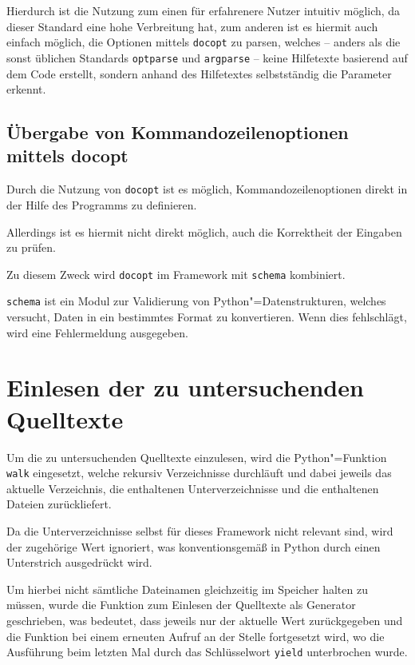             Hierdurch ist die Nutzung zum einen für erfahrenere Nutzer intuitiv möglich,
            da dieser Standard eine hohe Verbreitung hat,
            zum anderen ist es hiermit auch einfach möglich,
            die Optionen mittels
            \lstinline{docopt} zu parsen,
            welches
            -- anders als die sonst üblichen Standards
            \lstinline{optparse} und
            \lstinline{argparse}
            -- keine Hilfetexte basierend auf dem Code erstellt,
            sondern anhand des Hilfetextes selbstständig die Parameter erkennt.\cite{Keleshev2018}

        \subsection{Übergabe von Kommandozeilenoptionen mittels docopt}
            Durch die Nutzung von
            \lstinline{docopt} ist es möglich,
            Kommandozeilenoptionen direkt in der Hilfe des Programms zu definieren.

            Allerdings ist es hiermit nicht direkt möglich,
            auch die Korrektheit der Eingaben zu prüfen.

            Zu diesem Zweck wird
            \lstinline{docopt} im Framework mit
            \lstinline{schema} kombiniert.

            \lstinline{schema} ist ein Modul zur Validierung von Python"=Datenstrukturen,
            welches versucht,
            Daten in ein bestimmtes Format zu konvertieren.
            Wenn dies fehlschlägt,
            wird eine Fehlermeldung ausgegeben.\cite{Keleshev2018a}

    \section{Einlesen der zu untersuchenden Quelltexte}\label{Einlesen der zu untersuchenden Quelltexte}
        Um die zu untersuchenden Quelltexte einzulesen,
        wird die Python"=Funktion
        \lstinline{walk} eingesetzt,
        welche rekursiv Verzeichnisse durchläuft und
        dabei jeweils das aktuelle Verzeichnis,
        die enthaltenen Unterverzeichnisse und
        die enthaltenen Dateien zurückliefert.

        Da die Unterverzeichnisse selbst für dieses Framework nicht relevant sind,
        wird der zugehörige Wert ignoriert,
        was konventionsgemäß in Python durch einen Unterstrich ausgedrückt wird.

        Um hierbei nicht sämtliche Dateinamen gleichzeitig im Speicher halten zu müssen,
        wurde die Funktion zum Einlesen der Quelltexte als Generator geschrieben,
        was bedeutet,
        dass jeweils nur der aktuelle Wert zurückgegeben und
        die Funktion bei einem erneuten Aufruf an der Stelle fortgesetzt wird,
        wo die Ausführung beim letzten Mal durch das Schlüsselwort
        \lstinline{yield} unterbrochen wurde.

